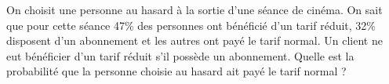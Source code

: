 
On choisit une personne au hasard à la sortie d'une séance de cinéma. On sait que pour cette séance 47\% des personnes ont bénéficié d'un tarif réduit, 32\% disposent d'un abonnement et les autres ont payé le tarif normal. Un client ne eut bénéficier d'un tarif réduit s'il possède un abonnement. Quelle est la probabilité que la personne choisie au hasard ait payé le tarif normal ?

 